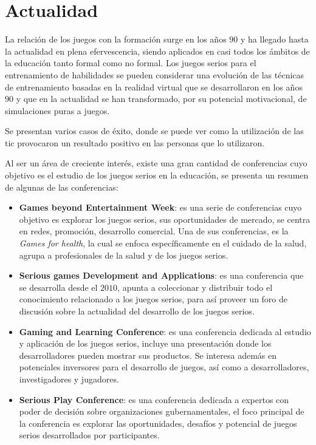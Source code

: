 \section{Actualidad}

La relación de los juegos con la formación surge en los años $90$ y ha llegado
hasta la actualidad en plena efervescencia, siendo aplicados en casi todos los
ámbitos de la educación tanto formal como no formal. Los juegos serios para el
entrenamiento de habilidades se pueden considerar una evolución de las técnicas
de entrenamiento basadas en la realidad virtual que se desarrollaron en los años
$90$ y que en la actualidad se han transformado, por su potencial motivacional,
de simulaciones puras a juegos\cite{videojuegos:gonzaleztardon}.

Se presentan varios casos de éxito, donde se puede ver como la utilización de
las \Gls{tic} provocaron un resultado positivo en las personas que lo
utilizaron.

Al ser un área de creciente interés, existe una gran cantidad de conferencias
cuyo objetivo es el estudio de los juegos serios en la educación, se presenta un
resumen de algunas de las conferencias:

\begin{itemize}
\item \textbf{Games beyond Entertainment Week}: es una serie de conferencias
    cuyo objetivo es explorar los juegos serios, sus oportunidades de mercado,
    se centra en redes, promoción, desarrollo comercial. Una de sus
    conferencias, es la \emph{Games for health}, la cual se enfoca
    específicamente en el cuidado de la salud, agrupa a profesionales de la
    salud y de los juegos serios\cite{games_beyond_entertainment}.
\item \textbf{Serious games Development and Applications}: es una conferencia
    que se desarrolla desde el $2010$, apunta a coleccionar y distribuir todo el
    conocimiento relacionado a los juegos serios, para así proveer un foro de
    discusión sobre la actualidad del desarrollo de los juegos
    serios\cite{sgda}.
\item \textbf{Gaming and Learning Conference}: es una conferencia dedicada al
    estudio y aplicación de los juegos serios, incluye una presentación donde
    los desarrolladores pueden mostrar sus productos. Se interesa además en
    potenciales inversores para el desarrollo de juegos, así como a
    desarrolladores, investigadores y jugadores\cite{gala}.
\item \textbf{Serious Play Conference}: es una conferencia dedicada a expertos
    con poder de decisión sobre organizaciones gubernamentales, el foco
    principal de la conferencia es explorar las oportunidades, desafíos y
    potencial de juegos serios desarrollados por
    participantes\cite{seriousplay}.
\end{itemize}

